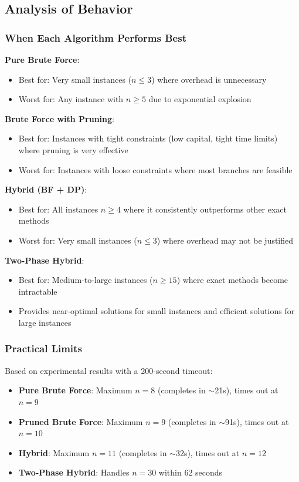 \documentclass[12pt]{article}
\begin{document}
\subsection{Analysis of Behavior}

\subsubsection{When Each Algorithm Performs Best}

\textbf{Pure Brute Force}:
\begin{itemize}
    \item Best for: Very small instances ($n \leq 3$) where overhead is unnecessary
    \item Worst for: Any instance with $n \geq 5$ due to exponential explosion
\end{itemize}

\textbf{Brute Force with Pruning}:
\begin{itemize}
    \item Best for: Instances with tight constraints (low capital, tight time limits) where pruning is very effective
    \item Worst for: Instances with loose constraints where most branches are feasible
\end{itemize}

\textbf{Hybrid (BF + DP)}:
\begin{itemize}
    \item Best for: All instances $n \geq 4$ where it consistently outperforms other exact methods
    \item Worst for: Very small instances ($n \leq 3$) where overhead may not be justified
\end{itemize}

\textbf{Two-Phase Hybrid}:
\begin{itemize}
    \item Best for: Medium-to-large instances ($n \geq 15$) where exact methods become intractable
    \item Provides near-optimal solutions for small instances and efficient solutions for large instances
\end{itemize}

\subsubsection{Practical Limits}

Based on experimental results with a 200-second timeout:
\begin{itemize}
    \item \textbf{Pure Brute Force}: Maximum $n = 8$ (completes in $\sim$21s), times out at $n = 9$
    \item \textbf{Pruned Brute Force}: Maximum $n = 9$ (completes in $\sim$91s), times out at $n = 10$
    \item \textbf{Hybrid}: Maximum $n = 11$ (completes in $\sim$32s), times out at $n = 12$
    \item \textbf{Two-Phase Hybrid}: Handles $n = 30$ within 62 seconds
\end{itemize}
\end{document}
